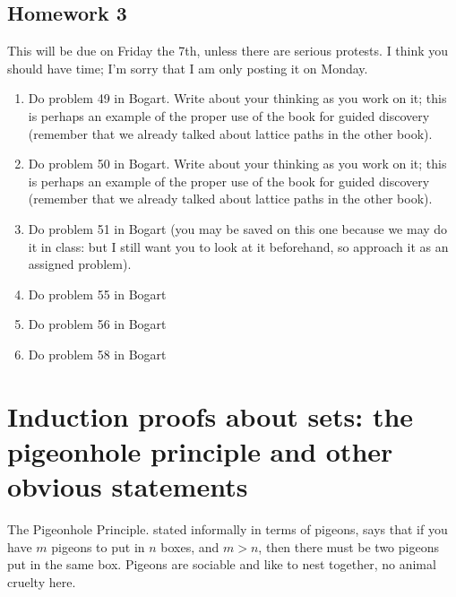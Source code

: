 \documentclass[12pt]{article}
\begin{document}
\begin{description}
\begin{description}
\section{Homework 3}

This will be due on Friday the 7th, unless there are serious protests.  I think you should have time;  I'm sorry that I am only posting it on Monday.

\begin{enumerate}

\item Do problem 49 in Bogart.  Write about your thinking as you work on it;  this is perhaps an example of the proper use of the book for guided discovery (remember that we already talked about lattice paths in the other book).


\item Do problem 50 in Bogart.  Write about your thinking as you work on it;  this is perhaps an example of the proper use of the book for guided discovery (remember that we already talked about lattice paths in the other book).


\item Do problem 51 in Bogart (you may be saved on this one because we may do it in class:  but I still want you to look at it beforehand, so approach it as an assigned problem).

\item Do problem 55 in Bogart


\item Do problem 56 in Bogart

\item Do problem 58 in Bogart


\end{enumerate}








\end{description}



\end{description}

\section{Induction proofs about sets:  the pigeonhole principle and other obvious statements}

The Pigeonhole Principle. stated informally in terms of pigeons, says that if you have $m$ pigeons to put in $n$ boxes,
and $m>n$, then there must be two pigeons put in the same box.  Pigeons are sociable and like to nest together, no animal cruelty here.
\end{document}

